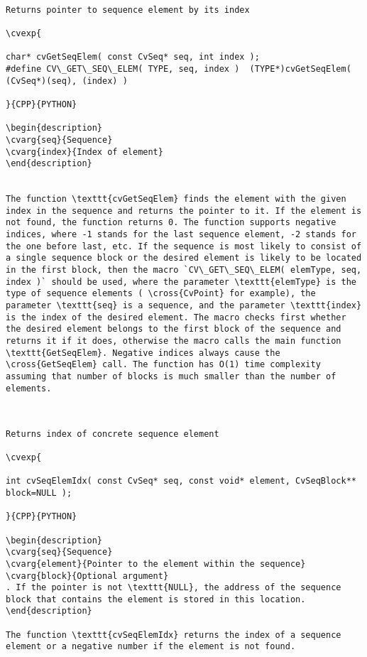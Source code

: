 \begin{verbatim}

Returns pointer to sequence element by its index

\cvexp{

char* cvGetSeqElem( const CvSeq* seq, int index );
#define CV\_GET\_SEQ\_ELEM( TYPE, seq, index )  (TYPE*)cvGetSeqElem( (CvSeq*)(seq), (index) )

}{CPP}{PYTHON}

\begin{description}
\cvarg{seq}{Sequence}
\cvarg{index}{Index of element}
\end{description}


The function \texttt{cvGetSeqElem} finds the element with the given index in the sequence and returns the pointer to it. If the element is not found, the function returns 0. The function supports negative indices, where -1 stands for the last sequence element, -2 stands for the one before last, etc. If the sequence is most likely to consist of a single sequence block or the desired element is likely to be located in the first block, then the macro `CV\_GET\_SEQ\_ELEM( elemType, seq, index )` should be used, where the parameter \texttt{elemType} is the type of sequence elements ( \cross{CvPoint} for example), the parameter \texttt{seq} is a sequence, and the parameter \texttt{index} is the index of the desired element. The macro checks first whether the desired element belongs to the first block of the sequence and returns it if it does, otherwise the macro calls the main function \texttt{GetSeqElem}. Negative indices always cause the \cross{GetSeqElem} call. The function has O(1) time complexity assuming that number of blocks is much smaller than the number of elements.


\end{verbatim}
\begin{verbatim}

Returns index of concrete sequence element

\cvexp{

int cvSeqElemIdx( const CvSeq* seq, const void* element, CvSeqBlock** block=NULL );

}{CPP}{PYTHON}

\begin{description}
\cvarg{seq}{Sequence}
\cvarg{element}{Pointer to the element within the sequence}
\cvarg{block}{Optional argument}
. If the pointer is not \texttt{NULL}, the address of the sequence block that contains the element is stored in this location.
\end{description}

The function \texttt{cvSeqElemIdx} returns the index of a sequence element or a negative number if the element is not found.


\end{verbatim}
